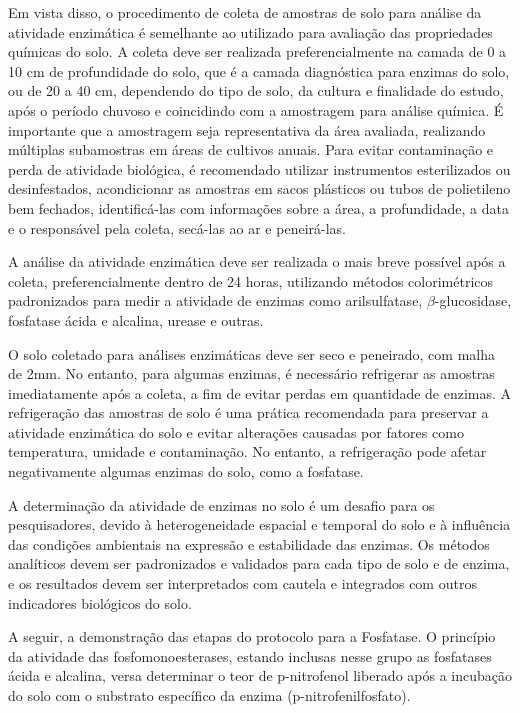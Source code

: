 Em vista disso, o procedimento de coleta de amostras de solo para análise da atividade enzimática é semelhante ao utilizado para avaliação das propriedades químicas do solo. A coleta deve ser realizada preferencialmente na camada de 0 a 10 cm de profundidade do solo, que é a camada diagnóstica para enzimas do solo, ou de 20 a 40 cm, dependendo do tipo de solo, da cultura e finalidade do estudo, após o período chuvoso e coincidindo com a amostragem para análise química. É importante que a amostragem seja representativa da área avaliada, realizando múltiplas subamostras em áreas de cultivos anuais. Para evitar contaminação e perda de atividade biológica, é recomendado utilizar instrumentos esterilizados ou desinfestados, acondicionar as amostras em sacos plásticos ou tubos de polietileno bem fechados, identificá-las com informações sobre a área, a profundidade, a data e o responsável pela coleta, secá-las ao ar e peneirá-las. 

A análise da atividade enzimática deve ser realizada o mais breve possível após a coleta, preferencialmente dentro de 24 horas, utilizando métodos colorimétricos padronizados para medir a atividade de enzimas como arilsulfatase, $\beta$-glucosidase, fosfatase ácida e alcalina, urease e outras.

O solo coletado para análises enzimáticas deve ser seco e peneirado, com malha de 2mm. No entanto, para algumas enzimas, é necessário refrigerar as amostras imediatamente após a coleta, a fim de evitar perdas em quantidade de enzimas. A refrigeração das amostras de solo é uma prática recomendada para preservar a atividade enzimática do solo e evitar alterações causadas por fatores como temperatura, umidade e contaminação. No entanto, a refrigeração pode afetar negativamente algumas enzimas do solo, como a fosfatase. 

A determinação da atividade de enzimas no solo é um desafio para os pesquisadores, devido à heterogeneidade espacial e temporal do solo e à influência das condições ambientais na expressão e estabilidade das enzimas. Os métodos analíticos devem ser padronizados e validados para cada tipo de solo e de enzima, e os resultados devem ser interpretados com cautela e integrados com outros indicadores biológicos do solo.

A seguir, a demonstração das etapas do protocolo para a Fosfatase. O princípio da atividade das fosfomonoesterases, estando inclusas nesse grupo as fosfatases ácida e alcalina, versa determinar o teor de p-nitrofenol liberado após a incubação do solo com o substrato específico da enzima (p-nitrofenilfosfato).

